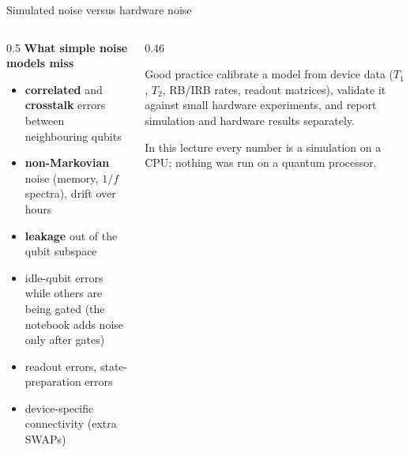 \documentclass[aspectratio=169,11pt]{beamer}
\newcommand{\key}[1]{{\color{qdark}\textbf{#1}}}
\begin{document}
\begin{frame}[label=fHW]{Simulated noise versus hardware noise}
  \begin{columns}[T]
    \begin{column}{0.5\textwidth}
      \small \key{What simple noise models miss}
      \begin{itemize}\itemsep1pt\scriptsize
        \item \key{correlated} and \key{crosstalk} errors between neighbouring qubits
        \item \key{non-Markovian} noise (memory, $1/f$ spectra), drift over hours
        \item \key{leakage} out of the qubit subspace
        \item idle-qubit errors while others are being gated (the notebook adds noise only after gates)
        \item readout errors, state-preparation errors
        \item device-specific connectivity (extra SWAPs)
      \end{itemize}
    \end{column}
    \begin{column}{0.46\textwidth}
      \begin{block}{Good practice}
        \scriptsize calibrate a model from device data ($T_1$, $T_2$, RB/IRB rates, readout matrices), validate it against small hardware experiments, and report
        simulation and hardware results separately.
      \end{block}
      \begin{alertblock}{In this lecture}
        \scriptsize every number is a simulation on a CPU; nothing was run on a quantum processor.
      \end{alertblock}
    \end{column}
  \end{columns}
\end{frame}
\end{document}
